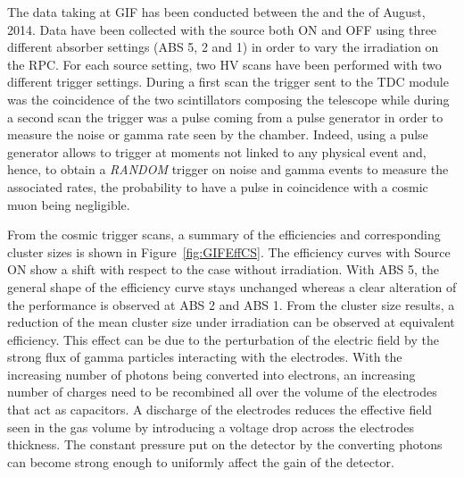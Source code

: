 	The data taking at GIF has been conducted between the  and the  of August, 2014. Data have been collected with the source both ON and OFF using three different absorber settings (ABS 5, 2 and 1) in order to vary the irradiation on the RPC. For each source setting, two HV scans have been performed with two different trigger settings. During a first scan the trigger sent to the TDC module was the coincidence of the two scintillators composing the telescope while during a second scan the trigger was a pulse coming from a pulse generator in order to measure the noise or gamma rate seen by the chamber. Indeed, using a pulse generator allows to trigger at moments not linked to any physical event and, hence, to obtain a \textit{RANDOM} trigger on noise and gamma events to measure the associated rates, the probability to have a pulse in coincidence with a cosmic muon being negligible.
	
	From the cosmic trigger scans, a summary of the efficiencies and corresponding cluster sizes is shown in Figure~\ref{fig:GIFEffCS}. The efficiency curves with Source ON show a shift with respect to the case without irradiation. With ABS 5, the general shape of the efficiency curve stays unchanged whereas a clear alteration of the performance is observed at ABS 2 and ABS 1. From the cluster size results, a reduction of the mean cluster size under irradiation can be observed at equivalent efficiency. This effect can be due to the perturbation of the electric field by the strong flux of gamma particles interacting with the electrodes. With the increasing number of photons being converted into electrons, an increasing number of charges need to be recombined all over the volume of the electrodes that act as capacitors. A discharge of the electrodes reduces the effective field seen in the gas volume by introducing a voltage drop across the electrodes thickness. The constant pressure put on the detector by the converting photons can become strong enough to uniformly affect the gain of the detector.
	
